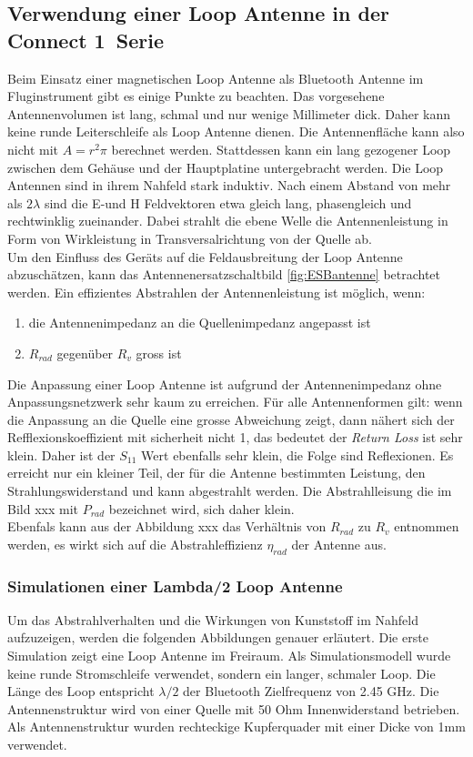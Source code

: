 \subsection{Verwendung einer Loop Antenne in der \glqq Connect 1\grqq \ Serie}
Beim Einsatz einer magnetischen Loop Antenne als Bluetooth Antenne im Fluginstrument gibt es einige Punkte zu beachten. Das vorgesehene Antennenvolumen ist lang, schmal und nur wenige Millimeter dick. Daher kann keine runde Leiterschleife als Loop Antenne dienen. Die Antennenfläche kann also nicht mit $A=r^{2}\pi$ berechnet werden. Stattdessen kann ein lang gezogener Loop zwischen dem Gehäuse und der Hauptplatine untergebracht werden. Die Loop Antennen sind in ihrem Nahfeld stark induktiv. Nach einem Abstand von mehr als $2\lambda$ sind die E-und H Feldvektoren etwa gleich lang, phasengleich und rechtwinklig zueinander. Dabei strahlt die ebene Welle die Antennenleistung in Form von Wirkleistung in Transversalrichtung von der Quelle ab.\\
Um den Einfluss des Geräts auf die Feldausbreitung der Loop Antenne abzuschätzen, kann das Antennenersatzschaltbild \ref{fig:ESBantenne} betrachtet werden. Ein effizientes Abstrahlen der Antennenleistung ist möglich, wenn:
 \begin{enumerate}[label={\alph*)}] 
 \item die Antennenimpedanz an die Quellenimpedanz angepasst ist 
 \item $R_{rad}$ gegenüber $R_{v}$ gross ist 
 \end{enumerate} 
Die Anpassung einer Loop Antenne ist aufgrund der Antennenimpedanz ohne Anpassungsnetzwerk sehr kaum zu erreichen. Für alle Antennenformen gilt: wenn die Anpassung an die Quelle eine grosse Abweichung zeigt, dann nähert sich der Refflexionskoeffizient mit sicherheit nicht 1, das bedeutet der \textit{Return Loss} ist sehr klein. Daher ist der $S_{11}$ Wert ebenfalls sehr klein, die Folge sind Reflexionen. 
Es erreicht nur ein kleiner Teil, der für die Antenne bestimmten Leistung, den Strahlungswiderstand und kann abgestrahlt werden. Die Abstrahlleisung die im Bild xxx mit $P_{rad}$ bezeichnet wird, sich daher klein.\\
Ebenfals kann aus der Abbildung xxx das Verhältnis von $R_{rad}$ zu $R_{v}$ entnommen werden, es wirkt sich auf die Abstrahleffizienz $\eta_{rad}$ der Antenne aus.

\subsubsection{Simulationen einer Lambda/2 Loop Antenne}\label{sec:SimL2Loop}
Um das Abstrahlverhalten und die Wirkungen von Kunststoff im Nahfeld aufzuzeigen, werden die folgenden Abbildungen genauer erläutert.
Die erste Simulation zeigt eine Loop Antenne im Freiraum. Als Simulationsmodell wurde keine runde Stromschleife verwendet, sondern ein langer, schmaler Loop. Die Länge des Loop entspricht $\lambda/2$ der Bluetooth Zielfrequenz von 2.45 GHz. Die Antennenstruktur wird von einer Quelle mit 50 Ohm Innenwiderstand betrieben. Als Antennenstruktur wurden rechteckige Kupferquader mit einer Dicke von 1mm verwendet.\\

